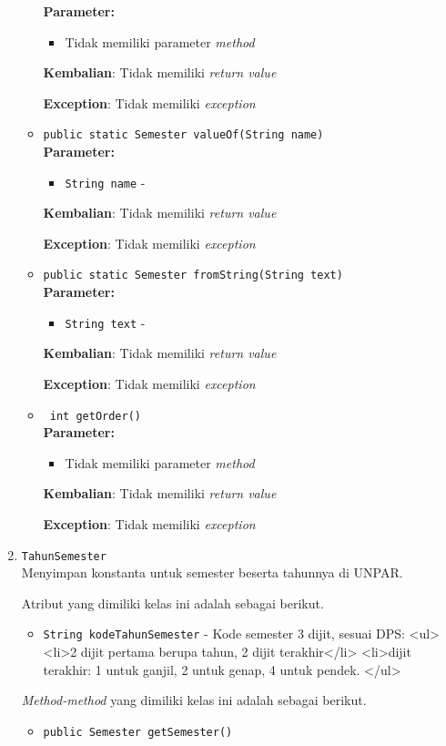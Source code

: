 \documentclass{article}
\begin{document}
\begin{enumerate}
\begin{itemize}
\textbf{Parameter:}\begin{itemize}
\item Tidak memiliki parameter \textit{method}
\end{itemize}
\textbf{Kembalian}: Tidak memiliki \textit{return value}

\textbf{Exception}: Tidak memiliki \textit{exception}

\item \texttt{public static Semester valueOf(String name)}\\ 


\textbf{Parameter:}\begin{itemize}
\item \texttt{String name} - 
\end{itemize}
\textbf{Kembalian}: Tidak memiliki \textit{return value}

\textbf{Exception}: Tidak memiliki \textit{exception}

\item \texttt{public static Semester fromString(String text)}\\ 


\textbf{Parameter:}\begin{itemize}
\item \texttt{String text} - 
\end{itemize}
\textbf{Kembalian}: Tidak memiliki \textit{return value}

\textbf{Exception}: Tidak memiliki \textit{exception}

\item \texttt{ int getOrder()}\\ 


\textbf{Parameter:}\begin{itemize}
\item Tidak memiliki parameter \textit{method}
\end{itemize}
\textbf{Kembalian}: Tidak memiliki \textit{return value}

\textbf{Exception}: Tidak memiliki \textit{exception}

\end{itemize}
\item \texttt{TahunSemester}\\ 
Menyimpan konstanta untuk semester beserta tahunnya di UNPAR.

Atribut yang dimiliki kelas ini adalah sebagai berikut.
\begin{itemize}
\item \texttt{String kodeTahunSemester} - Kode semester 3 dijit, sesuai DPS:
 <ul>
   <li>2 dijit pertama berupa tahun, 2 dijit terakhir</li>
   <li>dijit terakhir: 1 untuk ganjil, 2 untuk genap, 4 untuk pendek.
 </ul>
\end{itemize}
\textit{Method-method} yang dimiliki kelas ini adalah sebagai berikut.
\begin{itemize}
\item \texttt{public Semester getSemester()}\\ 



\end{itemize}
\end{enumerate}
\end{document}
